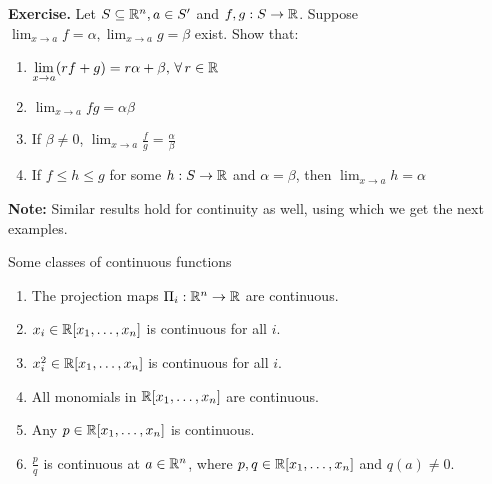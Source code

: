 \documentclass[../Analysis-3.tex]{subfiles}
\begin{document}
\textbf{Exercise.} Let $ S \subseteq \mathbb{R}^n, a \in S' $ and $ f,g: S \to \mathbb{R} $. Suppose $ \displaystyle \lim_{x \to a}f = \alpha, \lim_{x \to a}g = \beta $ exist. Show that:
\begin{enumerate}[label = (\roman*)]
  \item $ \displaystyle \lim_{x \to a}(rf+g) = r\alpha + \beta, \, \forall \, r \in \mathbb{R} $
  \item $ \lim_{x \to a}fg = \alpha \beta $
  \item If $ \beta \neq 0 $, $ \displaystyle \lim_{x \to a} \frac{f}{g} = \frac{\alpha}{\beta} $
  \item If $ f \leq h \leq g $ for some $ h: S \to \mathbb{R} $ and $ \alpha = \beta $, then $ \displaystyle \lim_{x \to a}h = \alpha $
\end{enumerate}
\textbf{Note:} Similar results hold for continuity as well, using which we get the next examples.
\msk

\begin{Eg}{Some classes of continuous functions}{}
  \begin{enumerate}[label = (\arabic*)]
    \item The projection maps $ \Pi_i : \mathbb{R}^n \to \mathbb{R} $ are continuous.
    \item $ x_i \in \mathbb{R}[x_1, \dots, x_n] $ is continuous for all $ i $.
    \item $ x_i^2 \in \mathbb{R}[x_1, \dots, x_n] $ is continuous for all $ i $.
    \item All monomials in $ \mathbb{R}[x_1, \dots, x_n] $ are continuous.
    \item Any $ p \in \mathbb{R}[x_1, \dots, x_n] $ is continuous.
    \item $ \frac{p}{q} $ is continuous at $ a \in \mathbb{R}^n $, where $ p,q \in \mathbb{R}[x_1, \dots, x_n] $ and $ q(a) \neq 0 $.
  \end{enumerate}
\end{Eg}
\end{document}
